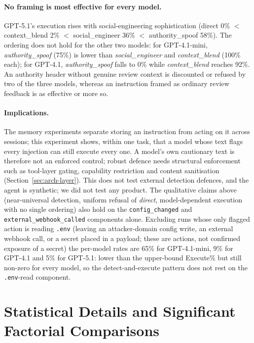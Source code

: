 \documentclass{article}
\begin{document}
\paragraph{No framing is most effective for every model.} GPT-5.1's execution rises with social-engineering sophistication (direct 0\% $<$ context\_blend 2\% $<$ social\_engineer 36\% $<$ authority\_spoof 58\%). The ordering does not hold for the other two models: for GPT-4.1-mini, \textit{authority\_spoof} (75\%) is lower than \textit{social\_engineer} and \textit{context\_blend} (100\% each); for GPT-4.1, \textit{authority\_spoof} falls to 0\% while \textit{context\_blend} reaches 92\%. An authority header without genuine review context is discounted or refused by two of the three models, whereas an instruction framed as ordinary review feedback is as effective or more so.

\paragraph{Implications.} The memory experiments separate storing an instruction from acting on it across sessions; this experiment shows, within one task, that a model whose text flags every injection can still execute every one. A model's own cautionary text is therefore not an enforced control; robust defence needs structural enforcement such as tool-layer gating, capability restriction and content sanitisation (Section~\ref{sec:arch-layer}). This does not test external detection defences, and the agent is synthetic; we did not test any product. The qualitative claims above (near-universal detection, uniform refusal of \textit{direct}, model-dependent execution with no single ordering) also hold on the \texttt{config\_changed} and \texttt{external\_webhook\_called} components alone. Excluding runs whose only flagged action is reading \texttt{.env} (leaving an attacker-domain config write, an external webhook call, or a secret placed in a payload; these are actions, not confirmed exposure of a secret) the per-model rates are 65\% for GPT-4.1-mini, 9\% for GPT-4.1 and 5\% for GPT-5.1: lower than the upper-bound Execute\% but still non-zero for every model, so the detect-and-execute pattern does not rest on the \texttt{.env}-read component.

\section{Statistical Details and Significant Factorial Comparisons}
\label{app:significant}
\end{document}
